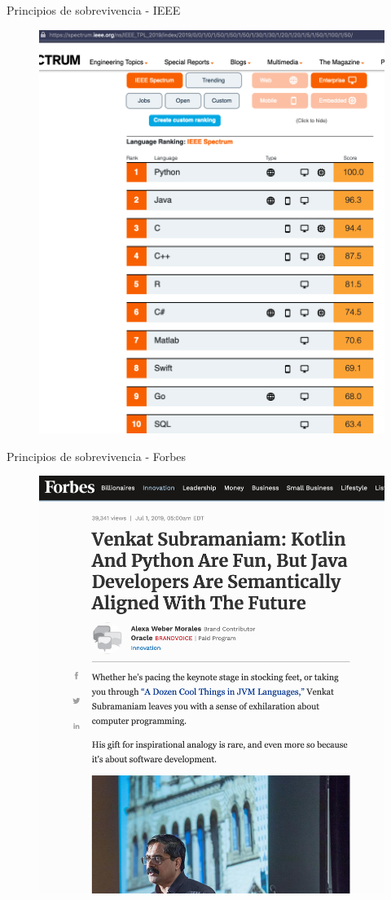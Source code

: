 \documentclass[aspectratio=169]{beamer}
\begin{document}
\begin{frame}{Principios de sobrevivencia - IEEE}
	\begin{figure}
		\centering
		\includegraphics[width=0.8\linewidth]{Images/ieeeenterpise}
	\end{figure}
\end{frame}

\begin{frame}{Principios de sobrevivencia - Forbes}
    \begin{figure}
        \centering
        \includegraphics[width=0.5\linewidth]{Images/venkat}
    \end{figure}
\end{frame}
\end{document}

